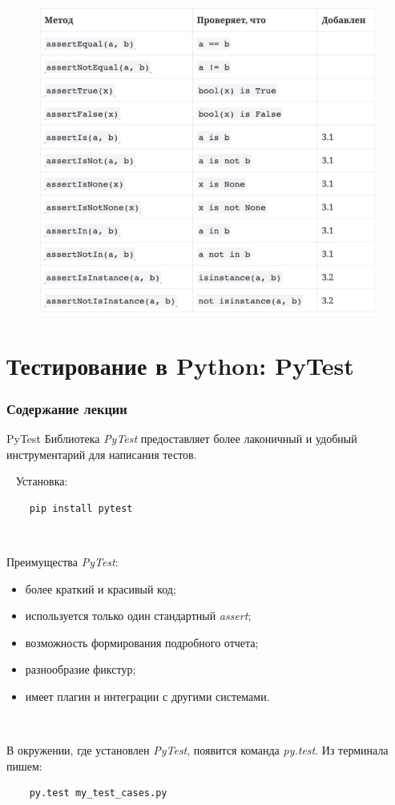 \documentclass[xcolor=table]{beamer}
\begin{document}
\begin{frame}[t, fragile]
	\begin{figure}[h]
		\centering
		\includegraphics[scale=0.3]{images/unittest-checks.jpg}
	\end{figure}
\end{frame}

\section{Тестирование в Python: PyTest}

\begin{frame}
  \frametitle{Содержание лекции}
  \tableofcontents[current]
\end{frame}

\begin{frame}[t, fragile]{PyTest}
	\linespread{0.8}
	Библиотека \textit{PyTest} предоставляет более лаконичный и удобный инструментарий для написания тестов.

	~	
	Установка:
	\begin{verbatim}
	pip install pytest
	\end{verbatim}
	
	~
	
	Преимущества \textit{PyTest}:
	\begin{itemize}
		\item более краткий и красивый код;
		\item используется только один стандартный \textit{assert};
		\item возможность формирования подробного отчета;
		\item разнообразие фикстур;
		\item имеет плагин и интеграции с другими системами.
	\end{itemize}
	
	~
	
	В окружении, где установлен \textit{PyTest}, появится команда \textit{py.test}. Из терминала пишем:
	\begin{verbatim}
	py.test my_test_cases.py
	\end{verbatim}
\end{frame}
\end{document}

